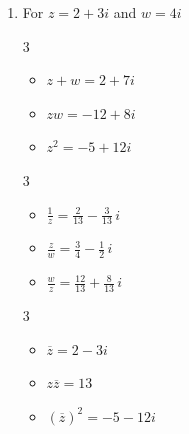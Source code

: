 \documentclass{ximera}
\begin{document}
	\author{Stitz-Zeager}


\begin{enumerate}

\item  For $z = 2+3i$ and $w = 4i$

\begin{multicols}{3}

\begin{itemize}

\item $z+w = 2+7i$

\item $zw = -12+8i$

\item $z^2 = -5 + 12i$

\end{itemize}

\end{multicols}

\begin{multicols}{3}

\begin{itemize}

\item $\frac{1}{z} = \frac{2}{13} - \frac{3}{13} \, i$

\item $\frac{z}{w} = \frac{3}{4} - \frac{1}{2} \, i$

\item $\frac{w}{z} = \frac{12}{13} + \frac{8}{13} \,i$

\end{itemize}

\end{multicols}

\begin{multicols}{3}

\begin{itemize}

\item $\overline{z} = 2-3i$

\item $z\overline{z} = 13$

\item $(\overline{z})^2 = -5-12i$

\end{itemize}

\end{multicols}


\end{enumerate}
\end{document}
